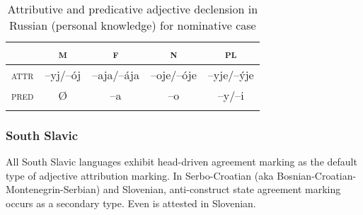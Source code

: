 \begin{table}[t]
\begin{tabular}{l c c c c}
\lsptoprule			
			&\textsc{m}	&\textsc{f}		&\textsc{n}	&\textsc{pl}\\
\midrule
\textsc{attr}	&–yj/–ój		&–aja/–ája	&–oje/–óje	&–yje/–\'yje\\
\textsc{pred}	&{Ø}		&–a			&–o			&–y/–i\\
\lspbottomrule
\end{tabular}
\caption[Adjective paradigm for Russian]{Attributive and predicative adjective declension in Russian (personal knowledge) for nominative case}
\label{Russian adj agr paradigm}
\end{table}

\subsubsection{South Slavic}
\label{s-slavic synchr}
All South Slavic languages exhibit head\hyp{}driven agreement marking as the default type of adjective attribution marking. In Serbo-Croatian (aka Bosnian-Croatian-Montenegrin-Serbian) and Slovenian, anti\hyp{}construct state agreement marking occurs as a secondary type. Even  is attested in Slovenian.

